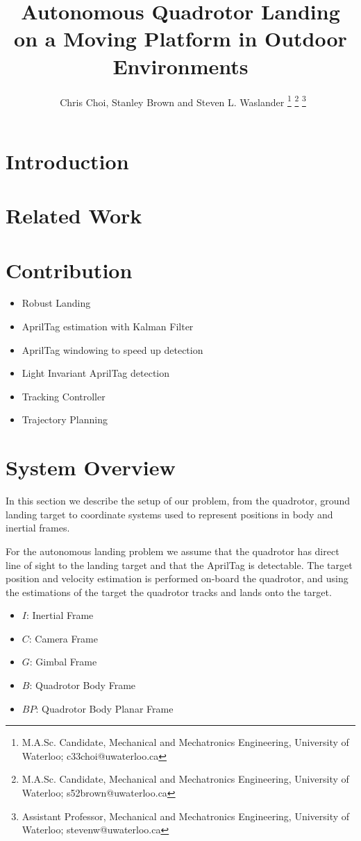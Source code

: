 \documentclass[letterpaper, 10 pt, conference]{ieeeconf}
\title{\large \textbf Autonomous Quadrotor Landing on a Moving Platform in
Outdoor Environments}
\author{\
Chris Choi\authorrefmark{1}, Stanley Brown\authorrefmark{2} and  Steven L. Waslander\authorrefmark{3}
\thanks{\superscript{*} M.A.Sc. Candidate, Mechanical and Mechatronics Engineering, University of Waterloo; c33choi@uwaterloo.ca}
\thanks{\superscript{2} M.A.Sc. Candidate, Mechanical and Mechatronics Engineering, University of Waterloo; s52brown@uwaterloo.ca}
\thanks{\superscript{\dag} Assistant Professor, Mechanical and Mechatronics Engineering, University of Waterloo; stevenw@uwaterloo.ca}
\vspace{0.5in}
}
\begin{document}
\maketitle
\thispagestyle{empty}
\pagestyle{empty}

\begin{abstract}
\end{abstract}


\section{Introduction}

\section{Related Work}


\section{Contribution}

\begin{itemize}
  \item{Robust Landing}
  \item{AprilTag estimation with Kalman Filter}
  \item{AprilTag windowing to speed up detection}
  \item{Light Invariant AprilTag detection}
  \item{Tracking Controller}
  \item{Trajectory Planning}
\end{itemize}

\section{System Overview}
In this section we describe the setup of our problem, from the quadrotor,
ground landing target to coordinate systems used to represent positions in
body and inertial frames.

For the autonomous landing problem we assume that the quadrotor has direct line
of sight to the landing target and that the AprilTag is detectable. The target
position and velocity estimation is performed on-board the quadrotor, and
using the estimations of the target the quadrotor tracks and lands onto the
target.

\begin{itemize}
  \item{$I$\@: Inertial Frame}
  \item{$C$\@: Camera Frame}
  \item{$G$\@: Gimbal Frame}
  \item{$B$\@: Quadrotor Body Frame}
  \item{$BP$\@: Quadrotor Body Planar Frame}
\end{itemize}
\end{document}
